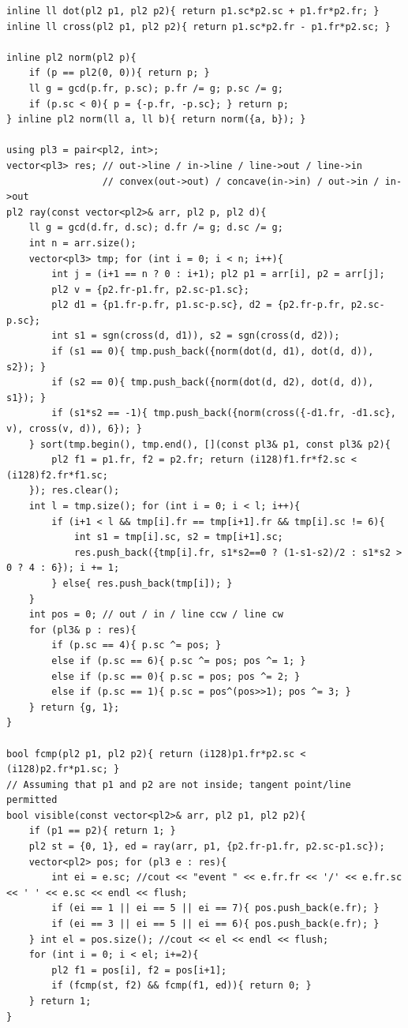 \begin{verbatim}
inline ll dot(pl2 p1, pl2 p2){ return p1.sc*p2.sc + p1.fr*p2.fr; }
inline ll cross(pl2 p1, pl2 p2){ return p1.sc*p2.fr - p1.fr*p2.sc; }

inline pl2 norm(pl2 p){
	if (p == pl2(0, 0)){ return p; }
	ll g = gcd(p.fr, p.sc); p.fr /= g; p.sc /= g;
	if (p.sc < 0){ p = {-p.fr, -p.sc}; } return p;
} inline pl2 norm(ll a, ll b){ return norm({a, b}); }

using pl3 = pair<pl2, int>;
vector<pl3> res; // out->line / in->line / line->out / line->in
                 // convex(out->out) / concave(in->in) / out->in / in->out
pl2 ray(const vector<pl2>& arr, pl2 p, pl2 d){
	ll g = gcd(d.fr, d.sc); d.fr /= g; d.sc /= g;
	int n = arr.size();
	vector<pl3> tmp; for (int i = 0; i < n; i++){
		int j = (i+1 == n ? 0 : i+1); pl2 p1 = arr[i], p2 = arr[j];
		pl2 v = {p2.fr-p1.fr, p2.sc-p1.sc};
		pl2 d1 = {p1.fr-p.fr, p1.sc-p.sc}, d2 = {p2.fr-p.fr, p2.sc-p.sc};
		int s1 = sgn(cross(d, d1)), s2 = sgn(cross(d, d2));
		if (s1 == 0){ tmp.push_back({norm(dot(d, d1), dot(d, d)), s2}); }
		if (s2 == 0){ tmp.push_back({norm(dot(d, d2), dot(d, d)), s1}); }
		if (s1*s2 == -1){ tmp.push_back({norm(cross({-d1.fr, -d1.sc}, v), cross(v, d)), 6}); }
	} sort(tmp.begin(), tmp.end(), [](const pl3& p1, const pl3& p2){
		pl2 f1 = p1.fr, f2 = p2.fr; return (i128)f1.fr*f2.sc < (i128)f2.fr*f1.sc;
	}); res.clear();
	int l = tmp.size(); for (int i = 0; i < l; i++){
		if (i+1 < l && tmp[i].fr == tmp[i+1].fr && tmp[i].sc != 6){
			int s1 = tmp[i].sc, s2 = tmp[i+1].sc;
			res.push_back({tmp[i].fr, s1*s2==0 ? (1-s1-s2)/2 : s1*s2 > 0 ? 4 : 6}); i += 1;
		} else{ res.push_back(tmp[i]); }
	}
	int pos = 0; // out / in / line ccw / line cw
	for (pl3& p : res){
		if (p.sc == 4){ p.sc ^= pos; }
		else if (p.sc == 6){ p.sc ^= pos; pos ^= 1; }
		else if (p.sc == 0){ p.sc = pos; pos ^= 2; }
		else if (p.sc == 1){ p.sc = pos^(pos>>1); pos ^= 3; }
	} return {g, 1};
}

bool fcmp(pl2 p1, pl2 p2){ return (i128)p1.fr*p2.sc < (i128)p2.fr*p1.sc; }
// Assuming that p1 and p2 are not inside; tangent point/line permitted
bool visible(const vector<pl2>& arr, pl2 p1, pl2 p2){
	if (p1 == p2){ return 1; }
	pl2 st = {0, 1}, ed = ray(arr, p1, {p2.fr-p1.fr, p2.sc-p1.sc});
	vector<pl2> pos; for (pl3 e : res){
		int ei = e.sc; //cout << "event " << e.fr.fr << '/' << e.fr.sc << ' ' << e.sc << endl << flush;
		if (ei == 1 || ei == 5 || ei == 7){ pos.push_back(e.fr); }
		if (ei == 3 || ei == 5 || ei == 6){ pos.push_back(e.fr); }
	} int el = pos.size(); //cout << el << endl << flush;
	for (int i = 0; i < el; i+=2){
		pl2 f1 = pos[i], f2 = pos[i+1];
		if (fcmp(st, f2) && fcmp(f1, ed)){ return 0; }
	} return 1;
}
\end{verbatim}